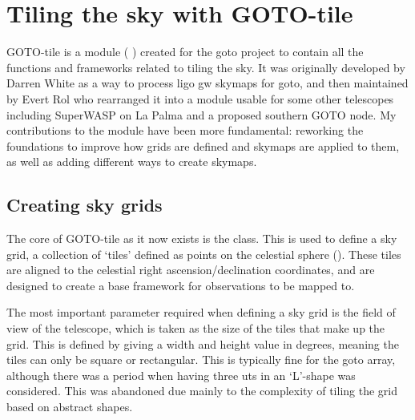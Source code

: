 
\newpage
\section{Tiling the sky with GOTO-tile}
\label{sec:gototile}
\begin{colsection}


\begin{colsection}

GOTO-tile is a  module ( ) created for the \gls{goto} project to contain all the functions and frameworks related to tiling the sky. It was originally developed by Darren White as a way to process \gls{ligo} \gls{gw} skymaps for \gls{goto}, and then maintained by Evert Rol who rearranged it into a module usable for some other telescopes including SuperWASP on La Palma and a proposed southern GOTO node. My contributions to the module have been more fundamental: reworking the foundations to improve how grids are defined and skymaps are applied to them, as well as adding different ways to create skymaps.

\end{colsection}


\subsection{Creating sky grids}
\label{sec:grids}
\begin{colsection}

The core of GOTO-tile as it now exists is the  class. This is used to define a sky grid, a collection of `tiles' defined as points on the celestial sphere (). These tiles are aligned to the celestial right ascension/declination coordinates, and are designed to create a base framework for observations to be mapped to.

The most important parameter required when defining a sky grid is the field of view of the telescope, which is taken as the size of the tiles that make up the grid. This is defined by giving a width and height value in degrees, meaning the tiles can only be square or rectangular. This is typically fine for the \gls{goto} array, although there was a period when having three \glspl{ut} in an `L'-shape was considered. This was abandoned due mainly to the complexity of tiling the grid based on abstract shapes.


\end{colsection}
\end{colsection}
